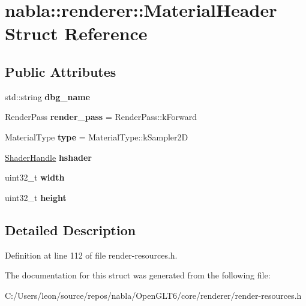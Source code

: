 \hypertarget{structnabla_1_1renderer_1_1_material_header}{}\section{nabla\+::renderer\+::Material\+Header Struct Reference}
\label{structnabla_1_1renderer_1_1_material_header}
\subsection*{Public Attributes}
\begin{DoxyCompactItemize}
\item 
\mbox{\label{structnabla_1_1renderer_1_1_material_header_a863b6084ead5441aa611d9ddac8f89d5}} 
std\+::string {\bfseries dbg\+\_\+name}
\item 
\mbox{\label{structnabla_1_1renderer_1_1_material_header_a78eaad05153e92a310c6fbe339d85247}} 
Render\+Pass {\bfseries render\+\_\+pass} = Render\+Pass\+::k\+Forward
\item 
\mbox{\label{structnabla_1_1renderer_1_1_material_header_a14e18bca70207248167dc58346317fa2}} 
Material\+Type {\bfseries type} = Material\+Type\+::k\+Sampler2D
\item 
\mbox{\label{structnabla_1_1renderer_1_1_material_header_a640dc062d254ae675862dbcc8ca11522}} 
\mbox{\hyperlink{classnabla_1_1renderer_1_1_handle}{Shader\+Handle}} {\bfseries hshader}
\item 
\mbox{\label{structnabla_1_1renderer_1_1_material_header_a2feb50f2fd400326917bfce38a7a6c68}} 
uint32\+\_\+t {\bfseries width}
\item 
\mbox{\label{structnabla_1_1renderer_1_1_material_header_afa35ba0b81eaf4fa0b02a99d42b19892}} 
uint32\+\_\+t {\bfseries height}
\end{DoxyCompactItemize}


\subsection{Detailed Description}


Definition at line 112 of file render-\/resources.\+h.



The documentation for this struct was generated from the following file\+:\begin{DoxyCompactItemize}
\item 
C\+:/\+Users/leon/source/repos/nabla/\+Open\+G\+L\+T6/core/renderer/render-\/resources.\+h\end{DoxyCompactItemize}
